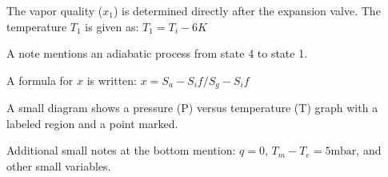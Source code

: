 The vapor quality (\( x_1 \)) is determined directly after the expansion valve.  
The temperature \( T_1 \) is given as:  
\( T_1 = T_i - 6K \)  

A note mentions an adiabatic process from state 4 to state 1.  

A formula for \( x \) is written:  
\( x = S_a - S_if / S_g - S_if \)  

A small diagram shows a pressure (P) versus temperature (T) graph with a labeled region and a point marked.  

Additional small notes at the bottom mention:  
\( q = 0 \), \( T_m - T_e = 5 \text{mbar} \), and other small variables.